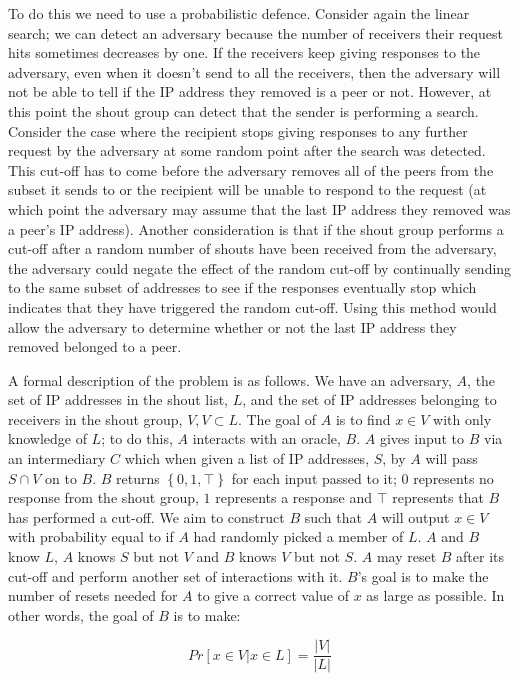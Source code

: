 \documentclass[ %
                    author={Luke Murray},
                supervisor={Dr. Simon Hollis},
                     title={Shadow Peer-to-Peer Networks},
                  subtitle={},
                    degree={MEng},
                      year={2013} ]{thesis}
\begin{document}
To do this we need to use a probabilistic defence. Consider again the linear search; we can detect an adversary because the number of receivers their request hits sometimes decreases by one. If the receivers keep giving responses to the adversary, even when it doesn't send to all the receivers, then the adversary will not be able to tell if the IP address they removed is a peer or not. However, at this point the shout group can detect that the sender is performing a search. Consider the case where the recipient stops giving responses to any further request by the adversary at some random point after the search was detected. This cut-off has to come before the adversary removes all of the peers from the subset it sends to or the recipient will be unable to respond to the request (at which point the adversary may assume that the last IP address they removed was a peer's IP address). Another consideration is that if the shout group performs a cut-off after a random number of shouts have been received from the adversary, the adversary could negate the effect of the random cut-off by continually sending to the same subset of addresses to see if the responses eventually stop which indicates that they have triggered the random cut-off. Using this method would allow the adversary to determine whether or not the last IP address they removed belonged to a peer.

A formal description of the problem is as follows. We have an adversary, $A$, the set of IP addresses in the shout list, $L$, and the set of IP addresses belonging to receivers in the shout group, $V, V \subset L$. The goal of $A$ is to find $x \in V$ with only knowledge of $L$; to do this, $A$ interacts with an oracle, $B$. $A$ gives input to $B$ via an intermediary $C$ which when given a list of IP addresses, $S$, by $A$ will pass $S \cap V$ on to $B$. $B$ returns $\left\{0, 1, \top\right\}$ for each input passed to it; $0$ represents no response from the shout group, $1$ represents a response and $\top$ represents that $B$ has performed a cut-off. We aim to construct $B$ such that $A$ will output $x \in V$ with probability equal to if $A$ had randomly picked a member of $L$. $A$ and $B$ know $L$, $A$ knows $S$ but not $V$ and $B$ knows $V$ but not $S$. $A$ may reset $B$ after its cut-off and perform another set of interactions with it. $B$'s goal is to make the number of resets needed for $A$ to give a correct value of $x$ as large as possible. In other words, the goal of $B$ is to make:

\[Pr[x \in V | x \in L] = \frac{|V|}{|L|}\]
\end{document}
